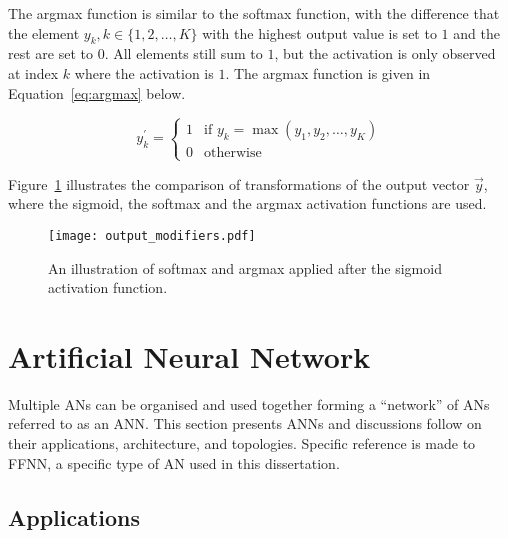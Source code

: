 The argmax function is similar to the softmax function, with the difference that the element $y_k, k \in \{1,2, \dots, K\}$ with the highest output value is set to $1$ and the rest are set to $0$. All elements still sum to $1$, but the activation is only observed at index $k$ where the activation is $1$. The argmax function is given in Equation~\eqref{eq:argmax} below.

\begin{equation}
    y^{'}_k =
    \begin{cases}
        1 & \text{if $y_k = \max(y_1, y_2, \dots, y_K)$} \\
        0 & \text{otherwise}
        \label{eq:argmax}
    \end{cases}
\end{equation}

\noindent
Figure~\ref{fig:anns:activation_functions:softmax_argmax} illustrates the comparison of transformations of the output vector $\vec{y}$, where the sigmoid, the softmax and the argmax activation functions are used.


\begin{figure}[htpb]
    \centering
    \texttt{[image: output\_modifiers.pdf]}
    \caption[The results of softmax and argmax]{An illustration of softmax and argmax applied after the sigmoid activation function.}
    \label{fig:anns:activation_functions:softmax_argmax}
\end{figure}


\section{Artificial Neural Network} \label{sec:anns:ann}

Multiple \acp{AN} can be organised and used together forming a ``network'' of \acp{AN} referred to as an \acf{ANN}. This section presents \acp{ANN} and discussions follow on their applications, architecture, and topologies. Specific reference is made to \acf{FFNN}, a specific type of \acs{AN} used in this dissertation.

\subsection{Applications} \label{sec:anns:anns:applications}

